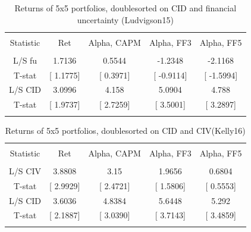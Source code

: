 \documentclass[16pt]{article}
\begin{document}
\begin{table}[!htbp] \centering 
  \caption{Returns of 5x5 portfolios, doublesorted on CID and financial uncertainty (Ludvigson15)} 
  \label{} 
\begin{tabular}{@{\extracolsep{5pt}} ccccc} 
\\[-1.8ex]\hline 
\hline \\[-1.8ex] 
Statistic & Ret & Alpha, CAPM & Alpha, FF3 & Alpha, FF5 \\ 
\hline \\[-1.8ex] 
L/S fu & 1.7136 & 0.5544 & -1.2348 & -2.1168 \\ 
T-stat & [ 1.1775] & [ 0.3971] & [ -0.9114] & [ -1.5994] \\ 
L/S CID & 3.0996 & 4.158 & 5.0904 & 4.788 \\ 
T-stat & [ 1.9737] & [ 2.7259] & [ 3.5001] & [ 3.2897] \\ 
\hline \\[-1.8ex] 
\end{tabular} 
\end{table}



\begin{table}[!htbp] \centering 
  \caption{Returns of 5x5 portfolios, doublesorted on CID and CIV(Kelly16)} 
  \label{} 
\begin{tabular}{@{\extracolsep{5pt}} ccccc} 
\\[-1.8ex]\hline 
\hline \\[-1.8ex] 
Statistic & Ret & Alpha, CAPM & Alpha, FF3 & Alpha, FF5 \\ 
\hline \\[-1.8ex] 
L/S CIV & 3.8808 & 3.15 & 1.9656 & 0.6804 \\ 
T-stat & [ 2.9929] & [ 2.4721] & [ 1.5806] & [ 0.5553] \\ 
L/S CID & 3.6036 & 4.8384 & 5.6448 & 5.292 \\ 
T-stat & [ 2.1887] & [ 3.0390] & [ 3.7143] & [ 3.4859] \\ 
\hline \\[-1.8ex] 
\end{tabular} 
\end{table}

\newpage
\end{document}

